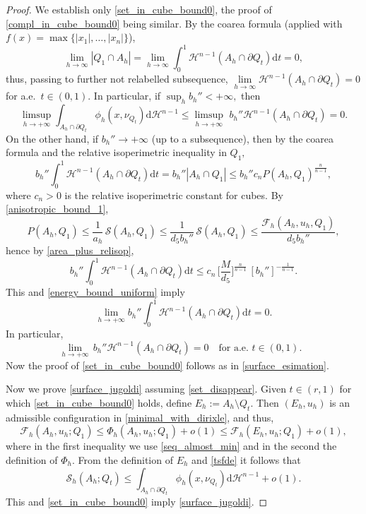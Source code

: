 \documentclass[reqno]{amsart}
\numberwithin{equation}{section}
\theoremstyle{plain}
\theoremstyle{definition}
\newcommand{\cH}{\mathcal{H}}
\newcommand{\cS}{\mathcal{S}}
\newcommand{\cF}{\mathcal{F}}
\newcommand{\p}{\partial}
\renewcommand{\d}{\mathrm{d}}
\begin{document}
\begin{proof}
We establish only \eqref{set_in_cube_bound0}, the proof of \eqref{compl_in_cube_bound0} being similar. By the coarea formula  (applied with $f(x)=\max\{|x_1|,\ldots,|x_n|\}$),
$$
\lim\limits_{h\to\infty} |Q_1\cap A_h| =\lim\limits_{h\to\infty} \int_0^1\cH^{n-1}(A_h\cap \p Q_t)\d t =0, 
$$
%
thus, passing to further not relabelled subsequence, $\lim\limits_{h\to\infty} \cH^{n-1}(A_h\cap \p Q_t)=0$ for a.e.\  $t\in(0,1).$  In particular, if $\sup_h b_h''<+\infty,$ then 
\begin{equation}
\limsup\limits_{h\to+\infty} \int_{A_h \cap \p Q_t} \phi_h(x,\nu_{Q_t})\d \cH^{n-1} \le \limsup\limits_{h\to+\infty} \,\, b_h''\cH^{n-1}(A_h \cap \p Q_t)=0.  
\label{surface_esimation} 
\end{equation}
%
%
On the other hand, if $b_h''\to+\infty$ (up to a subsequence), then by the coarea formula  and the relative isoperimetric inequality in $Q_1,$
%
\begin{equation}\label{area_plus_relisop}
b_h''\int_0^1 \cH^{n-1}(A_h\cap\p Q_t)\d t =b_h''|A_h\cap Q_1| \le b_h'' c_n P(A_h, Q_1)^{\frac{n}{n-1}},
\end{equation}
%
where $c_n>0$ is the relative isoperimetric constant for cubes.
%
By \eqref{anisotropic_bound_1},
$$
P(A_h, Q_1) \le \frac{1}{a_h}\,\cS(A_h,Q_1) \le \frac{1}{d_5 b_h''}\,\cS(A_h,Q_1) \le \frac{\cF_h(A_h,u_h,Q_1)}{d_5b_h''},
$$
hence by \eqref{area_plus_relisop},
$$
b_h''\int_0^1 \cH^{n-1}(A_h\cap\p Q_t)\d t  \le c_n\,
\Big[\frac{M}{d_5}\Big]^{\frac{n}{n-1}}\,[b_h'']^{-\frac{1}{n-1}}.
$$
This and \eqref{energy_bound_uniform} imply 
$$
\lim\limits_{h\to+\infty} b_h''\int_0^1 \cH^{n-1}(A_h\cap\p Q_t)\d t =0.
$$
In particular, 
$$
\lim\limits_{h\to+\infty} \,b_h'' \cH^{n-1}(A_h \cap \p Q_t)=0\quad\text{for a.e.\  $t\in(0,1).$ }
$$
Now the proof of \eqref{set_in_cube_bound0} follows as  in \eqref{surface_esimation}.

Now we prove \eqref{surface_jugoldi} assuming \eqref{set_disappear}. Given $t\in(r,1)$ for which \eqref{set_in_cube_bound0} holds, define $E_h:=A_h\setminus Q_t.$ Then $(E_h,u_h)$  is an admissible configuration in \eqref{minimal_with_dirixle},  and
thus, 
\begin{equation}\label{tsfde}
\cF_h(A_h,u_h; Q_1) \le \Phi_h(A_h,u_h;Q_1) +o(1) \le \cF_h(E_h,u_h; Q_1) + o(1), 
\end{equation}
%
where in the first inequality we use \eqref{seq_almost_min} and in the second the definition of $\Phi_h.$
From the definition of $E_h$ and \eqref{tsfde} it follows that
\begin{equation*}
\cS_h(A_h; Q_t) \le \int_{A_h \cap \p Q_t} \phi_h(x,\nu_{Q_t})\d \cH^{n-1} + o(1). 
\end{equation*}
%
This and \eqref{set_in_cube_bound0} imply \eqref{surface_jugoldi}.


\end{proof}
\end{document}

